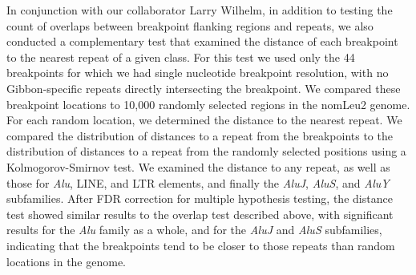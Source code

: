 
In conjunction with our collaborator Larry Wilhelm, in addition to testing the count of overlaps between breakpoint flanking regions and repeats, we also conducted a complementary test that examined the distance of each breakpoint to the nearest repeat of a given class. For this test we used only the 44 breakpoints for which we had single nucleotide breakpoint resolution, with no Gibbon-specific repeats directly intersecting the breakpoint. We compared these breakpoint locations to 10,000 randomly selected regions in the nomLeu2 genome. For each random location, we determined the distance to the nearest repeat. We compared the distribution of distances to a repeat from the breakpoints to the distribution of distances to a repeat from the randomly selected positions using a Kolmogorov-Smirnov test. We examined the distance to any repeat, as well as those for \emph{Alu}, LINE, and LTR elements, and finally the \emph{AluJ}, \emph{AluS}, and \emph{AluY} subfamilies. After FDR correction for multiple hypothesis testing, the distance test showed similar results to the overlap test described above, with significant results for the \emph{Alu} family as a whole, and for the \emph{AluJ} and \emph{AluS} subfamilies, indicating that the breakpoints tend to be closer to those repeats than random locations in the genome.

